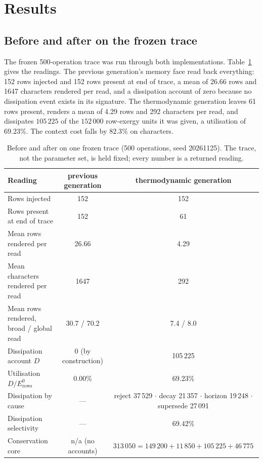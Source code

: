 \documentclass[11pt,a4paper]{article}
\newcommand{\Ezero}{E^{0}}
\begin{document}
\section{Results}
\label{sec:results}

\subsection{Before and after on the frozen trace}
\label{sec:beforeafter}
The frozen 500-operation trace was run through both implementations. Table~\ref{tab:beforeafter} gives the readings. The previous generation's memory face read back everything: 152 rows injected and 152 rows present at end of trace, a mean of 26.66 rows and 1647 characters rendered per read, and a dissipation account of zero because no dissipation event exists in its signature. The thermodynamic generation leaves 61 rows present, renders a mean of 4.29 rows and 292 characters per read, and dissipates $105\,225$ of the $152\,000$ row-exergy units it was given, a utilisation of $69.23\%$. The context cost falls by $82.3\%$ on characters.

\begin{table}[t]
\centering
\caption{Before and after on one frozen trace (500 operations, seed 20261125). The trace, not the parameter set, is held fixed; every number is a returned reading.}
\label{tab:beforeafter}
\begin{tabular}{lcc}
\toprule
Reading & previous generation & thermodynamic generation \\
\midrule
Rows injected & 152 & 152 \\
Rows present at end of trace & 152 & 61 \\
Mean rows rendered per read & 26.66 & 4.29 \\
Mean characters rendered per read & 1647 & 292 \\
Mean rows rendered, broad / global read & 30.7 / 70.2 & 7.4 / 8.0 \\
Dissipation account $D$ & 0 (by construction) & 105\,225 \\
Utilisation $D/\Ezero_{\mathrm{rows}}$ & $0.00\%$ & $69.23\%$ \\
Dissipation by cause & --- & reject 37\,529 $\cdot$ decay 21\,357 $\cdot$ horizon 19\,248 $\cdot$ supersede 27\,091 \\
Dissipation selectivity & --- & $69.42\%$ \\
Conservation core & n/a (no accounts) & $313\,050 = 149\,200 + 11\,850 + 105\,225 + 46\,775$ \\
\bottomrule
\end{tabular}
\end{table}
\end{document}
